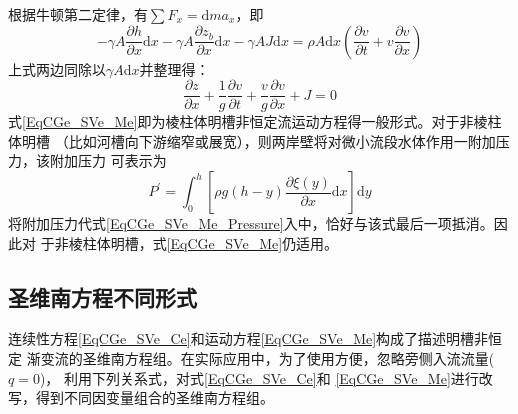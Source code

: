 根据牛顿第二定律，有$\sum F_{x}=\mathrm{d}ma_{x}$，即
\begin{equation}
  -\gamma A\frac{\partial h}{\partial x}\mathrm{d}x
  -\gamma A\frac{\partial z_{b}}{\partial x}\mathrm{d}x
  -\gamma AJ\mathrm{d}x
  =
  \rho A\mathrm{d}x
  \left(
  \frac{\partial v}{\partial t}
  +
  v
  \frac{\partial v}{\partial x}
  \right)
\end{equation}
上式两边同除以$\gamma A\mathrm{d}x$并整理得：
\begin{equation}
  \frac{\partial z}{\partial x}
  +
  \frac{1}{g}
  \frac{\partial v}{\partial t}
  +
  \frac{v}{g}
  \frac{\partial v}{\partial x}
  +
  J
  =
  0
  \label{EqCGe_SVe_Me}
\end{equation}
式\eqref{EqCGe_SVe_Me}即为棱柱体明槽非恒定流运动方程得一般形式。对于非棱柱体明槽
（比如河槽向下游缩窄或展宽），则两岸壁将对微小流段水体作用一附加压力，该附加压力
可表示为
\begin{equation}
  P^{\prime}
  =
  \int_{0}^{h}\!
  \left[
    \rho g(h-y)
    \frac{\partial \xi(y)}{\partial x}
    \mathrm{d}x
  \right]
  \mathrm{d}y
\end{equation}
将附加压力代式\eqref{EqCGe_SVe_Me_Pressure}入中，恰好与该式最后一项抵消。因此对
于非棱柱体明槽，式\eqref{EqCGe_SVe_Me}仍适用。

\subsection{圣维南方程不同形式}
连续性方程\eqref{EqCGe_SVe_Ce}和运动方程\eqref{EqCGe_SVe_Me}构成了描述明槽非恒定
渐变流的圣维南方程组。在实际应用中，为了使用方便，忽略旁侧入流流量($q=0$)，
利用下列关系式，对式\eqref{EqCGe_SVe_Ce}和
\eqref{EqCGe_SVe_Me}进行改写，得到不同因变量组合的圣维南方程组。

